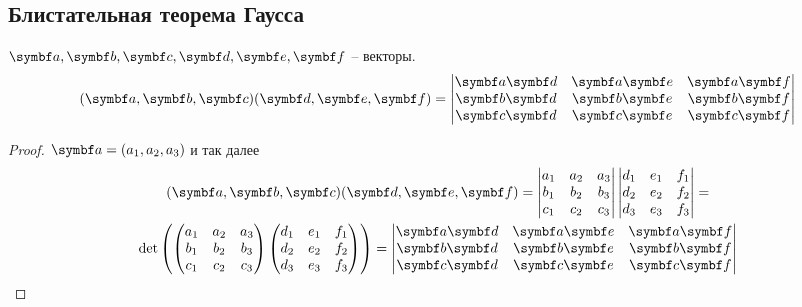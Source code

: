 \documentclass[main]{subfiles}
\begin{document}
\subsection{Блистательная теорема Гаусса}
\begin{lemma}
    $\va, \vb, \vc, \vd, \ve, \vf$ -- векторы.
    \[(\va, \vb, \vc)(\vd, \ve,\vf) = \begin{vmatrix}
            \va\vd & \va\ve & \va\vf \\
            \vb\vd & \vb\ve & \vb\vf \\
            \vc\vd & \vc\ve & \vc\vf
        \end{vmatrix}\]
\end{lemma}
\begin{proof}
    $\va = (a_1, a_2, a_3)$ и так далее
    \begin{multline*}
        (\va, \vb, \vc)(\vd, \ve, \vf) = \begin{vmatrix}
            a_1 & a_2 & a_3 \\
            b_1 & b_2 & b_3 \\
            c_1 & c_2 & c_3
        \end{vmatrix}
        \begin{vmatrix}
            d_1 & e_1 & f_1 \\
            d_2 & e_2 & f_2 \\
            d_3 & e_3 & f_3
        \end{vmatrix}
        = \\
        \det \left( \begin{pmatrix}
            a_1 & a_2 & a_3 \\
            b_1 & b_2 & b_3 \\
            c_1 & c_2 & c_3
        \end{pmatrix}
        \begin{pmatrix}
            d_1 & e_1 & f_1 \\
            d_2 & e_2 & f_2 \\
            d_3 & e_3 & f_3
        \end{pmatrix}\right) =
        \begin{vmatrix}
            \va\vd & \va\ve & \va\vf \\
            \vb\vd & \vb\ve & \vb\vf \\
            \vc\vd & \vc\ve & \vc\vf
        \end{vmatrix}
    \end{multline*}
\end{proof}
\end{document}
